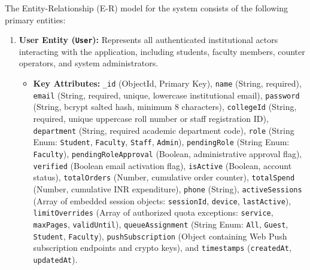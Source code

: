 \documentclass[12pt,a4paper]{report}
\begin{document}
The Entity-Relationship (E-R) model for the system consists of the following primary entities:

\begin{enumerate}[leftmargin=0.35in, itemsep=4pt]
  \item \textbf{User Entity (\texttt{User}):}
  Represents all authenticated institutional actors interacting with the application, including students, faculty members, counter operators, and system administrators.
  \begin{itemize}[leftmargin=0.25in, itemsep=2pt]
    \item \textbf{Key Attributes:} \texttt{\_id} (ObjectId, Primary Key), \texttt{name} (String, required), \texttt{email} (String, required, unique, lowercase institutional email), \texttt{password} (String, bcrypt salted hash, minimum 8 characters), \texttt{collegeId} (String, required, unique uppercase roll number or staff registration ID), \texttt{department} (String, required academic department code), \texttt{role} (String Enum: \texttt{Student}, \texttt{Faculty}, \texttt{Staff}, \texttt{Admin}), \texttt{pendingRole} (String Enum: \texttt{Faculty}), \texttt{pendingRoleApproval} (Boolean, administrative approval flag), \texttt{verified} (Boolean email activation flag), \texttt{isActive} (Boolean, account status), \texttt{totalOrders} (Number, cumulative order counter), \texttt{totalSpend} (Number, cumulative INR expenditure), \texttt{phone} (String), \texttt{activeSessions} (Array of embedded session objects: \texttt{sessionId}, \texttt{device}, \texttt{lastActive}), \texttt{limitOverrides} (Array of authorized quota exceptions: \texttt{service}, \texttt{maxPages}, \texttt{validUntil}), \texttt{queueAssignment} (String Enum: \texttt{All}, \texttt{Guest}, \texttt{Student}, \texttt{Faculty}), \texttt{pushSubscription} (Object containing Web Push subscription endpoints and crypto keys), and \texttt{timestamps} (\texttt{createdAt}, \texttt{updatedAt}).
  \end{itemize}


\end{enumerate}
\end{document}
